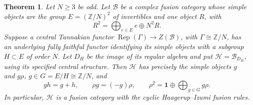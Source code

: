 \documentclass[11pt,a4paper]{article}
\numberwithin{equation}{section}
\newtheorem{theorem}{Theorem}[section]
\theoremstyle{definition}\newtheorem{definition}[theorem]{Definition}
\theoremstyle{remark}\newtheorem{remark}[theorem]{Remark}
\begin{document}
\begin{theorem}\label{audit:cyclicconverse}
Let $N\geq3$ be odd. Let $\mathcal B$ be a complex fusion category
whose simple objects are the group
$E=(\mathbb Z/N)^2$ of invertibles and one object $R$, with
\[
 R^2=\bigoplus_{e\in E}e\oplus N^2R.
\]
Suppose a central Tannakian functor
$\operatorname{Rep}(\Gamma)\to Z(\mathcal B)$, with
$\Gamma\cong\mathbb Z/N$, has an underlying fully faithful functor
identifying its simple objects with a subgroup $H\subset E$ of order
$N$. Let $D_H$ be the image of its regular algebra and put
$\mathcal H=\mathcal B_{D_H}$, using its specified central structure.
Then $\mathcal H$ has precisely the simple objects
$g$ and $g\rho$, $g\in G=E/H\cong\mathbb Z/N$, and
\[
 gh=g+h,\qquad \rho g=(-g)\rho,\qquad
 \rho^2=\mathbf1\oplus\bigoplus_{g\in G}g\rho.
\]
In particular, $\mathcal H$ is a fusion category with the
cyclic Haagerup--Izumi fusion rules.
\end{theorem}
\end{document}
